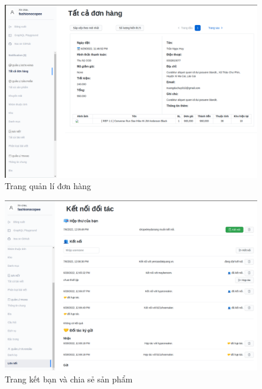 \begin{figure}[!htbp]
	\begin{center}	
		\includegraphics[width=\textwidth]{./results/order}
		\caption{Trang quản lí đơn hàng}
	\end{center}
\end{figure}
\clearpage
\FloatBarrier
\begin{figure}[!htbp]
	\begin{center}	
		\includegraphics[width=\textwidth]{./results/contract}
		\caption{Trang kết bạn và chia sẻ sản phẩm}
	\end{center}
\end{figure}
\clearpage
\FloatBarrier
